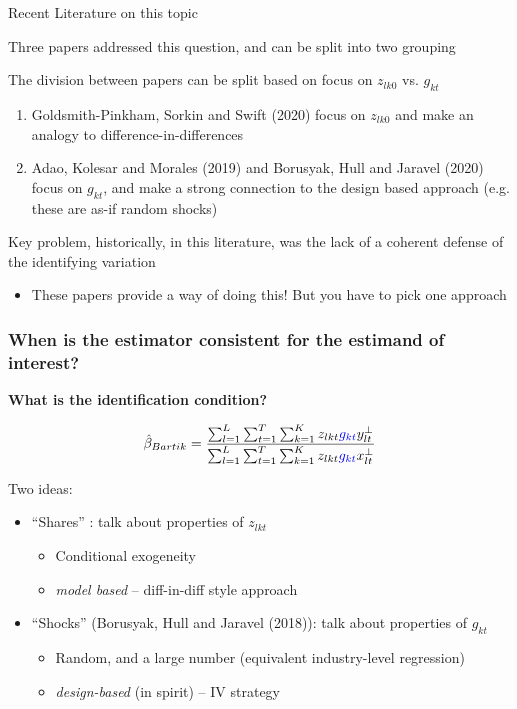 \documentclass[notes,11pt, aspectratio=169]{beamer}
\newenvironment{wideitemize}{\itemize\addtolength{\itemsep}{10pt}}{\enditemize}
\begin{document}
\begin{frame}{Recent Literature on this topic}
  \begin{wideitemize}
  \item Three papers addressed this question, and can be split into two grouping
  \item The division between papers can be split based on focus on $z_{lk0}$ vs. $g_{kt}$
    \begin{enumerate}
    \item Goldsmith-Pinkham, Sorkin and Swift (2020) focus on $z_{lk0}$ and make an analogy to difference-in-differences
    \item Adao, Kolesar and Morales (2019) and Borusyak, Hull and Jaravel (2020) focus on $g_{kt}$, and make a strong connection to the design based approach (e.g. these are as-if random shocks)
    \end{enumerate}
  \item Key problem, historically, in this literature, was the lack
    of a coherent defense of the identifying variation
    \begin{itemize}
      \item These papers provide a way of doing this! But you have to pick one approach
    \end{itemize}
  \end{wideitemize}
\end{frame}




\begin{frame}
\frametitle{When is the estimator consistent for the estimand of interest?}
\begin{center}
\textbf{What is the identification condition?}
\end{center}

$$\hat{\beta}_{Bartik}=  \frac{  \sum_{l=1}^L \sum_{t=1}^T \sum_{k=1}^K  z_{lkt} \textcolor{blue}{g_{kt}} y_{lt}^\perp    }{   \sum_{l=1}^L \sum_{t=1}^T \sum_{k=1}^K  z_{lkt} \textcolor{blue}{g_{kt}} x_{lt}^\perp   }  $$

Two ideas:
\begin{itemize}
\item ``Shares'' : talk about properties of $z_{lkt}$
	\begin{itemize}
	\item Conditional exogeneity
        \item \emph{model based} -- diff-in-diff style approach
	\end{itemize}
\item ``Shocks'' (Borusyak, Hull and Jaravel (2018)): talk about properties of $g_{kt}$
	\begin{itemize}
	\item Random, and a large number (equivalent industry-level regression)
        \item \emph{design-based} (in spirit) -- IV strategy
	\end{itemize}
\end{itemize}

\end{frame}
\end{document}
